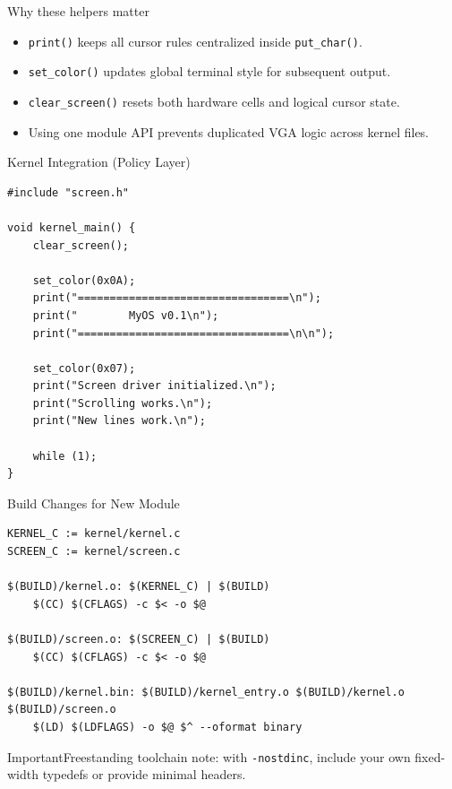 \documentclass[aspectratio=169]{beamer}
\newcommand{\warn}[1]{%
  \begin{alertblock}{Important}\smallskip #1\smallskip\end{alertblock}\vspace{5pt}}
\begin{document}
\begin{frame}{Why these helpers matter}
  \begin{itemize}
    \item \texttt{print()} keeps all cursor rules centralized inside \texttt{put\_char()}.
    \item \texttt{set\_color()} updates global terminal style for subsequent output.
    \item \texttt{clear\_screen()} resets both hardware cells and logical cursor state.
    \item Using one module API prevents duplicated VGA logic across kernel files.
  \end{itemize}
\end{frame}

\begin{frame}[fragile]{Kernel Integration (Policy Layer)}
  \begin{lstlisting}[style=clang]
#include "screen.h"

void kernel_main() {
    clear_screen();

    set_color(0x0A);
    print("=================================\n");
    print("        MyOS v0.1\n");
    print("=================================\n\n");

    set_color(0x07);
    print("Screen driver initialized.\n");
    print("Scrolling works.\n");
    print("New lines work.\n");

    while (1);
}
  \end{lstlisting}
\end{frame}

\begin{frame}[fragile]{Build Changes for New Module}
  \begin{lstlisting}[style=makefile]
KERNEL_C := kernel/kernel.c
SCREEN_C := kernel/screen.c

$(BUILD)/kernel.o: $(KERNEL_C) | $(BUILD)
	$(CC) $(CFLAGS) -c $< -o $@

$(BUILD)/screen.o: $(SCREEN_C) | $(BUILD)
	$(CC) $(CFLAGS) -c $< -o $@

$(BUILD)/kernel.bin: $(BUILD)/kernel_entry.o $(BUILD)/kernel.o $(BUILD)/screen.o
	$(LD) $(LDFLAGS) -o $@ $^ --oformat binary
  \end{lstlisting}
  \warn{Freestanding toolchain note: with \texttt{-nostdinc}, include your own fixed-width typedefs or provide minimal headers.}
\end{frame}
\end{document}
